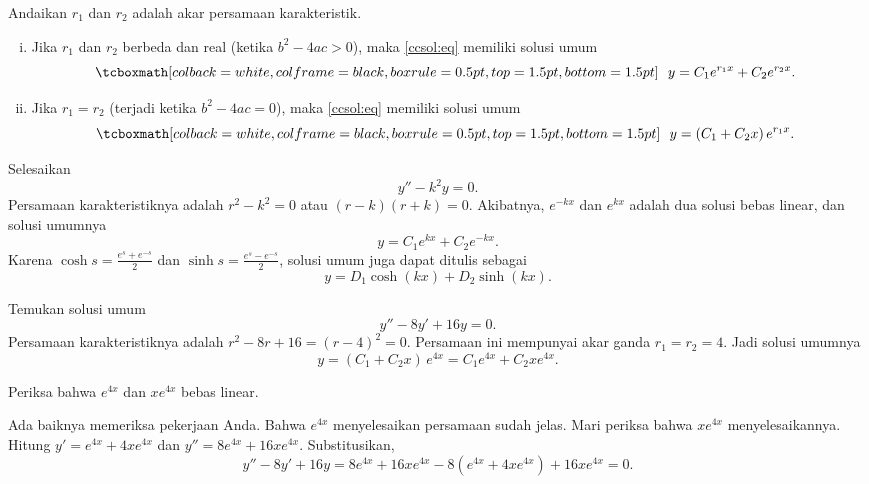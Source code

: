 \begin{theorem}
Andaikan $r_1$ dan $r_2$ adalah akar persamaan karakteristik.
\begin{enumerate}[(i)]
\item Jika $r_1$ dan $r_2$ berbeda dan real (ketika $b^2 - 4ac > 0$), maka \eqref{ccsol:eq} memiliki solusi umum
\begin{equation*}
\mybxbg{~~
y = C_1 e^{r_1 x} + C_2 e^{r_2 x} .
~~}
\end{equation*}
\item Jika $r_1 = r_2$ (terjadi ketika $b^2 - 4ac = 0$), maka \eqref{ccsol:eq} memiliki solusi umum
\begin{equation*}
\mybxbg{~~
y = (C_1 + C_2 x)\, e^{r_1 x} .
~~}
\end{equation*}
\end{enumerate}
\end{theorem}

\begin{example} \label{example:expsecondorder}
Selesaikan
\begin{equation*}
y'' - k^2 y = 0 .
\end{equation*}
Persamaan karakteristiknya adalah $r^2 - k^2 = 0$ atau $(r-k)(r+k) = 0$. Akibatnya, $e^{-k x}$ dan $e^{kx}$ adalah dua solusi bebas linear, dan solusi umumnya
\begin{equation*}
y = C_1 e^{kx} + C_2e^{-kx} .
\end{equation*}
Karena $\cosh s = \frac{e^s+e^{-s}}{2}$ dan $\sinh s = \frac{e^s-e^{-s}}{2}$, solusi umum juga dapat ditulis sebagai
\begin{equation*}
y = D_1 \cosh(kx) + D_2 \sinh(kx) .
\end{equation*}
\end{example}

\begin{example}
Temukan solusi umum
\begin{equation*}
y'' -8 y' + 16 y = 0 .
\end{equation*}
Persamaan karakteristiknya adalah $r^2 - 8 r + 16 = {(r-4)}^2 = 0$. Persamaan ini mempunyai akar ganda $r_1 = r_2 = 4$. Jadi solusi umumnya
\begin{equation*}
y = (C_1 + C_2 x)\, e^{4 x} = C_1 e^{4x} + C_2 x e^{4x} .
\end{equation*}

\begin{exercise}
Periksa bahwa $e^{4x}$ dan $x e^{4x}$ bebas linear.
\end{exercise}

Ada baiknya memeriksa pekerjaan Anda. Bahwa $e^{4x}$ menyelesaikan persamaan sudah jelas. Mari periksa bahwa $x e^{4x}$ menyelesaikannya. Hitung $y' = e^{4x} + 4xe^{4x}$ dan $y'' = 8 e^{4x} + 16xe^{4x}$. Substitusikan,
\begin{equation*}
y'' - 8 y' + 16 y =
8 e^{4x} + 16xe^{4x} - 8(e^{4x} + 4xe^{4x}) + 16 xe^{4x} =
0 .
\end{equation*}
\end{example}

